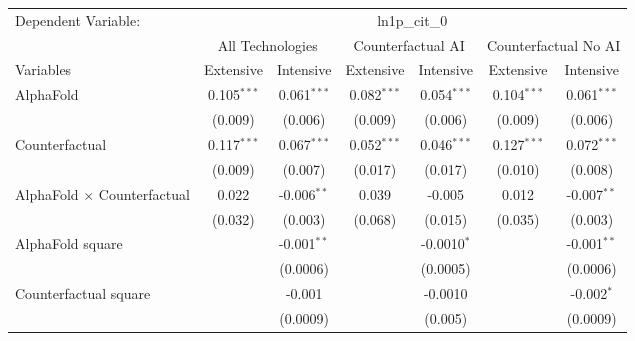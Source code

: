 \begingroup
\centering
\begin{tabular}{lcccccc}
   \tabularnewline \midrule \midrule
   Dependent Variable: & \multicolumn{6}{c}{ln1p\_cit\_0}\\
 & \multicolumn{2}{c}{All Technologies} & \multicolumn{2}{c}{Counterfactual AI} & \multicolumn{2}{c}{Counterfactual No AI} \\
\cmidrule(lr){1-1}\cmidrule(lr){2-3} \cmidrule(lr){4-5} \cmidrule(lr){6-7}
Variables & \multicolumn{1}{c}{Extensive} & \multicolumn{1}{c}{Intensive} & \multicolumn{1}{c}{Extensive} & \multicolumn{1}{c}{Intensive} & \multicolumn{1}{c}{Extensive} & \multicolumn{1}{c}{Intensive} \\
\cmidrule(lr){1-1}\cmidrule(lr){2-2} \cmidrule(lr){3-3} \cmidrule(lr){4-4} \cmidrule(lr){5-5} \cmidrule(lr){6-6} \cmidrule(lr){7-7}
   AlphaFold                          & 0.105$^{***}$ & 0.061$^{***}$ & 0.082$^{***}$ & 0.054$^{***}$ & 0.104$^{***}$ & 0.061$^{***}$\\   
                                      & (0.009)       & (0.006)       & (0.009)       & (0.006)       & (0.009)       & (0.006)\\   
   Counterfactual                     & 0.117$^{***}$ & 0.067$^{***}$ & 0.052$^{***}$ & 0.046$^{***}$ & 0.127$^{***}$ & 0.072$^{***}$\\   
                                      & (0.009)       & (0.007)       & (0.017)       & (0.017)       & (0.010)       & (0.008)\\   
   AlphaFold $\times$ Counterfactual  & 0.022         & -0.006$^{**}$ & 0.039         & -0.005        & 0.012         & -0.007$^{**}$\\   
                                      & (0.032)       & (0.003)       & (0.068)       & (0.015)       & (0.035)       & (0.003)\\   
   AlphaFold square                   &               & -0.001$^{**}$ &               & -0.0010$^{*}$ &               & -0.001$^{**}$\\   
                                      &               & (0.0006)      &               & (0.0005)      &               & (0.0006)\\   
   Counterfactual square              &               & -0.001        &               & -0.0010       &               & -0.002$^{*}$\\   
                                      &               & (0.0009)      &               & (0.005)       &               & (0.0009)\\   

\end{tabular}
